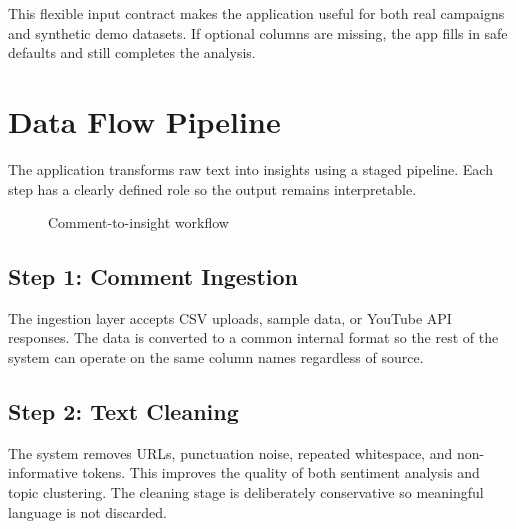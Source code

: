 This flexible input contract makes the application useful for both real campaigns and synthetic demo datasets. If optional columns are missing, the app fills in safe defaults and still completes the analysis.

\section{Data Flow Pipeline}
The application transforms raw text into insights using a staged pipeline. Each step has a clearly defined role so the output remains interpretable.

\begin{figure}[H]
\centering
{}
\caption{Comment-to-insight workflow}
\label{fig:workflow}
\end{figure}

\subsection{Step 1: Comment Ingestion}
The ingestion layer accepts CSV uploads, sample data, or YouTube API responses. The data is converted to a common internal format so the rest of the system can operate on the same column names regardless of source.

\subsection{Step 2: Text Cleaning}
The system removes URLs, punctuation noise, repeated whitespace, and non-informative tokens. This improves the quality of both sentiment analysis and topic clustering. The cleaning stage is deliberately conservative so meaningful language is not discarded.

